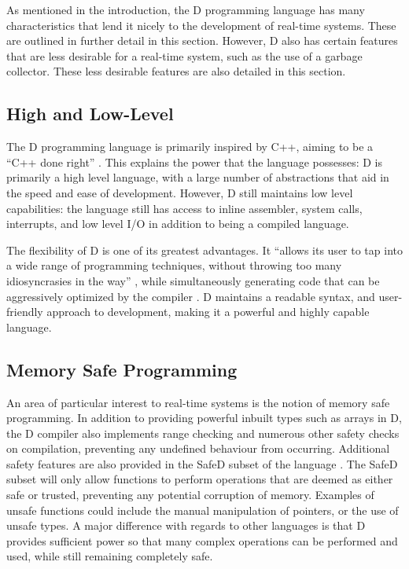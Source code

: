 As mentioned in the introduction, the D programming language has many 
characteristics that lend it nicely to the development of real-time systems.
These are outlined in further detail in this section. 
However, D also has certain features that are less desirable for a real-time 
system, such as the use of a garbage collector. These less desirable features 
are also detailed in this section.


\subsection{High and Low-Level}
The D programming language is primarily inspired by C++, aiming to be a ``C++ done
right'' 
\cite{qznc-tutorial}. This explains the 
power that the language possesses: D is primarily a high level language, with
a large number of abstractions that aid in the speed and ease of development. 
However, D still maintains low level capabilities: the language still has access 
to inline assembler, system calls, interrupts, and low level I/O in addition to 
being a compiled language.
\par\bigskip\noindent
The flexibility of D is one of its greatest advantages. It ``allows its user to tap 
into a wide range of programming techniques, without throwing too many 
idiosyncrasies in the way''
\cite{ddili-book}, 
while simultaneously generating code that can be aggressively optimized by the
compiler 
\cite{dlang-overview}. D maintains a readable syntax, and 
user-friendly approach to development, making it a powerful and highly capable 
language.

\subsection{Memory Safe Programming}
An area of particular interest to real-time systems is the notion of memory 
safe programming. In addition to providing powerful inbuilt types such as arrays 
in D, the D compiler also implements range checking and numerous other 
safety checks on compilation, preventing any undefined behaviour from occurring.
Additional safety features are also provided in the SafeD subset of the language
\cite{safe-d}. The SafeD subset will only allow functions to perform 
operations that are deemed as either safe or trusted, preventing any 
potential corruption of memory. Examples of unsafe functions could include the 
manual manipulation of pointers, or the use of unsafe types. A major difference 
with regards to other languages is that D provides sufficient power so that many complex 
operations can be performed and used, while still remaining completely safe.


